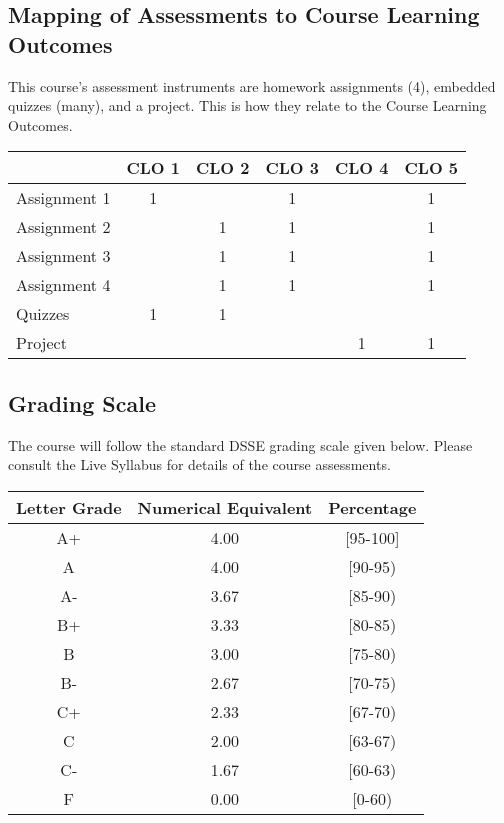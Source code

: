 \documentclass[a4paper]{article}
\begin{document}
\subsection{Mapping of Assessments to Course Learning Outcomes}

This course’s assessment instruments are homework assignments (4), embedded quizzes (many), and a project. This is how they relate to the Course Learning Outcomes.
\smallskip

\noindent
\begin{tabularx}{1.0\linewidth}{|l||*5{C|}}
  \hline
  &CLO 1& CLO 2& CLO 3& CLO 4& CLO 5\\  \hline\hline
  Assignment 1 & 1 & & 1 & & 1 \\\hline
  Assignment 2 & & 1 & 1 & & 1 \\\hline
  Assignment 3 & & 1 & 1 & & 1 \\\hline
  Assignment 4 & & 1 & 1 & & 1 \\\hline
  Quizzes & 1 & 1 & & & \\\hline
  Project & & & & 1 & 1 \\\hline
\end{tabularx}

\subsection{Grading Scale}

The course will follow the standard DSSE grading scale given below. Please consult the Live Syllabus for details of the course assessments.

\begin{center}
  \begin{tabular}{|*3{c|}}
\hline
Letter Grade & Numerical Equivalent & Percentage\\\hline\hline
A+ & 4.00 & [95-100] \\\hline
A & 4.00 & [90-95) \\\hline
A- & 3.67 & [85-90) \\\hline
B+ & 3.33 & [80-85) \\\hline
B & 3.00 & [75-80) \\\hline
B- & 2.67 & [70-75) \\\hline
C+ & 2.33 & [67-70) \\\hline
C & 2.00 & [63-67) \\\hline
C- & 1.67 & [60-63) \\\hline
F & 0.00 & [0-60) \\\hline
  \end{tabular}
\end{center}
\end{document}
